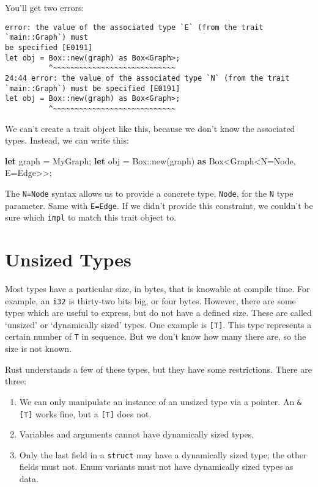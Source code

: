 \documentclass[a4paper,]{book}
\renewcommand*{\hypertarget}[3][\ar]{%
  \def\ar{#2}%
  \label{#1}%
  #3}
\newenvironment{Shaded}{\begin{snugshade}}{\end{snugshade}}
\newcommand{\KeywordTok}[1]{\textcolor[rgb]{0.13,0.29,0.53}{\textbf{{#1}}}}
\newcommand{\DataTypeTok}[1]{\textcolor[rgb]{0.13,0.29,0.53}{{#1}}}
\newcommand{\NormalTok}[1]{{#1}}
\providecommand{\tightlist}{%
  \setlength{\itemsep}{0pt}\setlength{\parskip}{0pt}}
\begin{document}
You'll get two errors:

\begin{verbatim}
error: the value of the associated type `E` (from the trait `main::Graph`) must
be specified [E0191]
let obj = Box::new(graph) as Box<Graph>;
          ^~~~~~~~~~~~~~~~~~~~~~~~~~~~~
24:44 error: the value of the associated type `N` (from the trait
`main::Graph`) must be specified [E0191]
let obj = Box::new(graph) as Box<Graph>;
          ^~~~~~~~~~~~~~~~~~~~~~~~~~~~~
\end{verbatim}

We can't create a trait object like this, because we don't know the
associated types. Instead, we can write this:

\begin{Shaded}
\begin{Highlighting}[]
\KeywordTok{let} \NormalTok{graph = MyGraph;}
\KeywordTok{let} \NormalTok{obj = }\DataTypeTok{Box}\NormalTok{::new(graph) }\KeywordTok{as} \DataTypeTok{Box}\NormalTok{<Graph<N=Node, E=Edge>>;}
\end{Highlighting}
\end{Shaded}

The \texttt{N=Node} syntax allows us to provide a concrete type,
\texttt{Node}, for the \texttt{N} type parameter. Same with
\texttt{E=Edge}. If we didn't provide this constraint, we couldn't be
sure which \texttt{impl} to match this trait object to.

\hypertarget{sec--unsized-types}{\section{Unsized
Types}\label{sec--unsized-types}}

Most types have a particular size, in bytes, that is knowable at compile
time. For example, an \texttt{i32} is thirty-two bits big, or four
bytes. However, there are some types which are useful to express, but do
not have a defined size. These are called `unsized' or `dynamically
sized' types. One example is \texttt{{[}T{]}}. This type represents a
certain number of \texttt{T} in sequence. But we don't know how many
there are, so the size is not known.

Rust understands a few of these types, but they have some restrictions.
There are three:

\begin{enumerate}
\def\labelenumi{\arabic{enumi}.}
\tightlist
\item
  We can only manipulate an instance of an unsized type via a pointer.
  An \texttt{\&{[}T{]}} works fine, but a \texttt{{[}T{]}} does not.
\item
  Variables and arguments cannot have dynamically sized types.
\item
  Only the last field in a \texttt{struct} may have a dynamically sized
  type; the other fields must not. Enum variants must not have
  dynamically sized types as data.
\end{enumerate}
\end{document}
